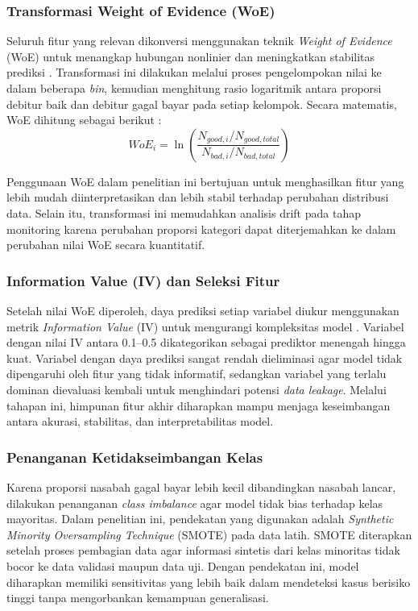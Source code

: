 \subsubsection{Transformasi Weight of Evidence (WoE)}
Seluruh fitur yang relevan dikonversi menggunakan teknik \textit{Weight of Evidence} (WoE) untuk menangkap hubungan nonlinier dan meningkatkan stabilitas prediksi \cite{venkatsai2025validation}. Transformasi ini dilakukan melalui proses pengelompokan nilai ke dalam beberapa \textit{bin}, kemudian menghitung rasio logaritmik antara proporsi debitur baik dan debitur gagal bayar pada setiap kelompok. Secara matematis, WoE dihitung sebagai berikut \cite{venkatsai2025validation}:
\begin{equation}
    WoE_{i} = \ln \left( \frac{N_{good,i} / N_{good,total}}{N_{bad,i} / N_{bad,total}} \right)
\end{equation}

Penggunaan WoE dalam penelitian ini bertujuan untuk menghasilkan fitur yang lebih mudah diinterpretasikan dan lebih stabil terhadap perubahan distribusi data. Selain itu, transformasi ini memudahkan analisis drift pada tahap monitoring karena perubahan proporsi kategori dapat diterjemahkan ke dalam perubahan nilai WoE secara kuantitatif.

\subsubsection{Information Value (IV) dan Seleksi Fitur}
Setelah nilai WoE diperoleh, daya prediksi setiap variabel diukur menggunakan metrik \textit{Information Value} (IV) untuk mengurangi kompleksitas model \cite{maurino2025data}. Variabel dengan nilai IV antara 0.1--0.5 dikategorikan sebagai prediktor menengah hingga kuat. Variabel dengan daya prediksi sangat rendah dieliminasi agar model tidak dipengaruhi oleh fitur yang tidak informatif, sedangkan variabel yang terlalu dominan dievaluasi kembali untuk menghindari potensi \textit{data leakage}. Melalui tahapan ini, himpunan fitur akhir diharapkan mampu menjaga keseimbangan antara akurasi, stabilitas, dan interpretabilitas model.

\subsubsection{Penanganan Ketidakseimbangan Kelas}
Karena proporsi nasabah gagal bayar lebih kecil dibandingkan nasabah lancar, dilakukan penanganan \textit{class imbalance} agar model tidak bias terhadap kelas mayoritas. Dalam penelitian ini, pendekatan yang digunakan adalah \textit{Synthetic Minority Oversampling Technique} (SMOTE) pada data latih. SMOTE diterapkan setelah proses pembagian data agar informasi sintetis dari kelas minoritas tidak bocor ke data validasi maupun data uji. Dengan pendekatan ini, model diharapkan memiliki sensitivitas yang lebih baik dalam mendeteksi kasus berisiko tinggi tanpa mengorbankan kemampuan generalisasi.

